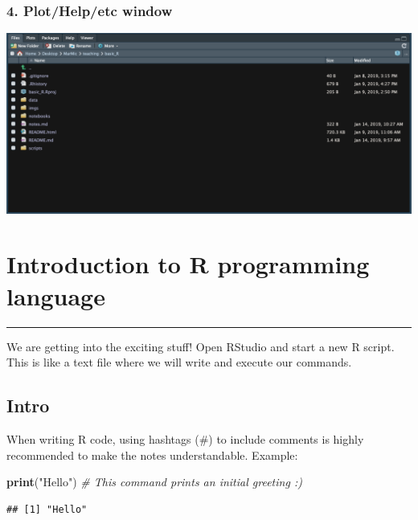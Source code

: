 \documentclass[
]{article}
\newenvironment{Shaded}{\begin{snugshade}}{\end{snugshade}}
\newcommand{\CommentTok}[1]{\textcolor[rgb]{0.56,0.35,0.01}{\textit{#1}}}
\newcommand{\KeywordTok}[1]{\textcolor[rgb]{0.13,0.29,0.53}{\textbf{#1}}}
\newcommand{\NormalTok}[1]{#1}
\newcommand{\StringTok}[1]{\textcolor[rgb]{0.31,0.60,0.02}{#1}}
\begin{document}
\hypertarget{plothelpetc-window}{%
\subsubsection{4. Plot/Help/etc window}\label{plothelpetc-window}}

\includegraphics{imgs/4_files.png}

\hypertarget{introduction-to-r-programming-language}{%
\section{Introduction to R programming
language}\label{introduction-to-r-programming-language}}

\begin{center}\rule{0.5\linewidth}{\linethickness}\end{center}

We are getting into the exciting stuff! Open RStudio and start a new R
script. This is like a text file where we will write and execute our
commands.

\hypertarget{intro}{%
\subsection{Intro}\label{intro}}

When writing R code, using hashtags (\#) to include comments is highly
recommended to make the notes understandable. Example:

\begin{Shaded}
\begin{Highlighting}[]
\KeywordTok{print}\NormalTok{(}\StringTok{"Hello"}\NormalTok{) }\CommentTok{# This command prints an initial greeting :)}
\end{Highlighting}
\end{Shaded}

\begin{verbatim}
## [1] "Hello"
\end{verbatim}
\end{document}
